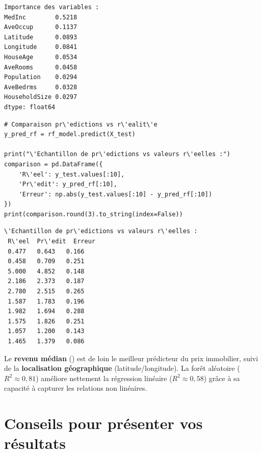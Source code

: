 \begin{codeoutput}
\begin{verbatim}
Importance des variables :
MedInc        0.5218
AveOccup      0.1137
Latitude      0.0893
Longitude     0.0841
HouseAge      0.0534
AveRooms      0.0458
Population    0.0294
AveBedrms     0.0328
HouseholdSize 0.0297
dtype: float64
\end{verbatim}
\end{codeoutput}

\begin{codeblock}[title=\textbf{Python}]
\begin{verbatim}
# Comparaison pr\'edictions vs r\'ealit\'e
y_pred_rf = rf_model.predict(X_test)

print("\'Echantillon de pr\'edictions vs valeurs r\'eelles :")
comparison = pd.DataFrame({
    'R\'eel': y_test.values[:10],
    'Pr\'edit': y_pred_rf[:10],
    'Erreur': np.abs(y_test.values[:10] - y_pred_rf[:10])
})
print(comparison.round(3).to_string(index=False))
\end{verbatim}
\end{codeblock}

\begin{codeoutput}
\begin{verbatim}
\'Echantillon de pr\'edictions vs valeurs r\'eelles :
 R\'eel  Pr\'edit  Erreur
 0.477   0.643   0.166
 0.458   0.709   0.251
 5.000   4.852   0.148
 2.186   2.373   0.187
 2.780   2.515   0.265
 1.587   1.783   0.196
 1.982   1.694   0.288
 1.575   1.826   0.251
 1.057   1.200   0.143
 1.465   1.379   0.086
\end{verbatim}
\end{codeoutput}

\begin{intuition}
Le \textbf{revenu m\'edian} () est de loin le meilleur pr\'edicteur du prix immobilier, suivi de la \textbf{localisation g\'eographique} (latitude/longitude). La for\^et al\'eatoire ($R^2 \approx 0{,}81$) am\'eliore nettement la r\'egression lin\'eaire ($R^2 \approx 0{,}58$) gr\^ace \`a sa capacit\'e \`a capturer les relations non lin\'eaires.
\end{intuition}

\section{Conseils pour pr\'esenter vos r\'esultats}
\label{sec:conseils_presentation}

